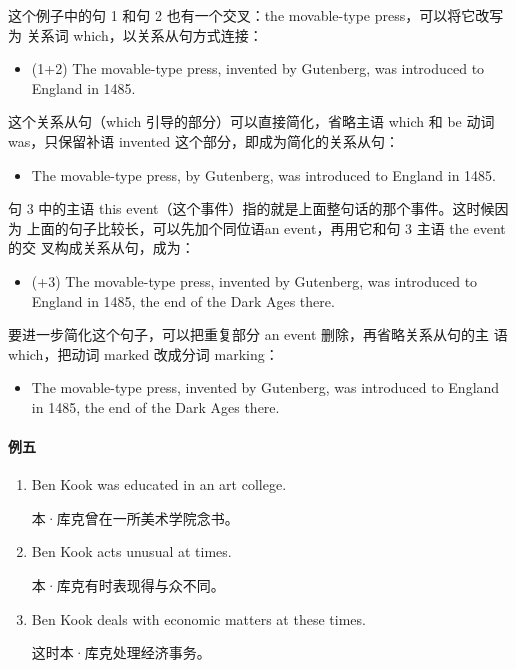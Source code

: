 这个例子中的句 1 和句 2 也有一个交叉：the movable-type press，可以将它改写为
关系词 which，以关系从句方式连接：
\begin{itemize}
\item (1+2) The movable-type press,  invented by Gutenberg, was
  introduced to England in 1485.
\end{itemize}
这个关系从句（which 引导的部分）可以直接简化，省略主语 which 和 be 动词
was，只保留补语 invented 这个部分，即成为简化的关系从句：
\begin{itemize}
\item The movable-type press,  by Gutenberg, was introduced to England
  in 1485.
\end{itemize}
句 3 中的主语 this event（这个事件）指的就是上面整句话的那个事件。这时候因为
上面的句子比较长，可以先加个同位语an event，再用它和句 3 主语 the event 的交
叉构成关系从句，成为：
\begin{itemize}
\item (+3) The movable-type press, invented by Gutenberg, was introduced to
  England in 1485,  the end of the Dark Ages there.
\end{itemize}
要进一步简化这个句子，可以把重复部分 an event 删除，再省略关系从句的主
语which，把动词 marked 改成分词 marking：
\begin{itemize}
\item   The movable-type press, invented by Gutenberg, was introduced to
  England in 1485,  the end of the Dark Ages there.
\end{itemize}

\paragraph{例五}

\begin{enumerate}
\item Ben Kook was educated in an art college.

  本·库克曾在一所美术学院念书。
\item Ben Kook acts unusual at times.

  本·库克有时表现得与众不同。
\item Ben Kook deals with economic matters at these times.

  这时本·库克处理经济事务。
\end{enumerate}

